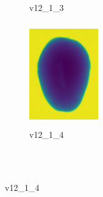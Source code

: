 \documentclass[11pt]{article}
\begin{document}
\begin{figure}
\begin{subfigure}[b]{0.15\textwidth}
        \caption{v12\_1\_3}
         \label{fig:five over x}
     \end{subfigure}
     \hfill
    \begin{subfigure}[b]{0.15\textwidth}
         \centering
         \includegraphics[width=3cm, height=4.5cm]{images/kartofler/v12_1_4_cut.png}
        \caption{v12\_1\_4}
         \label{fig:five over x}
     \end{subfigure}
     
     
        \\ \\
        

\end{figure}
\end{document}
